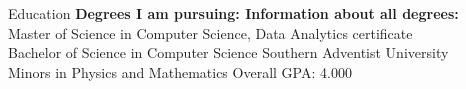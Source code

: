 \begin{rSection}{Education}
  {\bf\small Degrees I am pursuing: \hfill \bf Information about all degrees:}\\
	Master of Science in Computer Science, Data Analytics certificate \hfill {}\\
	Bachelor of Science in Computer Science \hfill {Southern Adventist University}\\
	Minors in Physics and Mathematics \hfill {Overall GPA: 4.000}
\end{rSection}